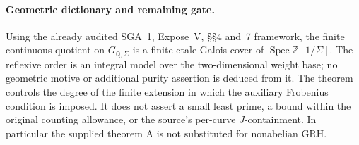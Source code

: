 \paragraph{Geometric dictionary and remaining gate.}
Using the already audited SGA~1, Expose~V, \S\S4 and~7 framework,
the finite continuous quotient on \(G_{\mathbb Q,\Sigma}\)
is a finite etale Galois cover of
\(\operatorname{Spec}\mathbb Z[1/\Sigma]\).
The reflexive order is an integral model over the two-dimensional
weight base; no geometric motive or additional purity assertion is
deduced from it.
The theorem controls the degree of the finite extension in which the
auxiliary Frobenius condition is imposed.
It does not assert a small least prime, a bound within the original
counting allowance, or the source's per-curve \(J\)-containment.
In particular the supplied theorem A is not substituted for
nonabelian GRH.
